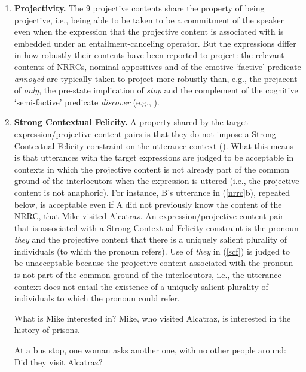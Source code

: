 \documentclass[11pt,fleqn]{article}
\newcommand{\6}{\mbox{$[\hspace*{-.6mm}[$}}
\newcommand{\9}{\mbox{$]\hspace*{-.6mm}]$}}
\def\infelic{{\leavevmode\llap{\#}}}
\begin{document}
\begin{enumerate}
	\item \textbf{Projectivity.} The 9 projective contents share the property of being projective, i.e., being able to be taken to be a commitment of the speaker even when the expression that the projective content is associated with is embedded under an entailment-canceling operator. But the expressions differ in how robustly their contents have been reported to project: 
the relevant contents of NRRCs, nominal appositives and of the emotive `factive' predicate {\em annoyed} are typically taken to project more robustly than, e.g., the prejacent of {\em only}, the pre-state implication of {\em stop} and the complement of the cognitive `semi-factive' predicate {\em discover} (e.g., \citealt{karttunen71b,simons01,potts05,abusch10,beaver-belly}). 
	\item \textbf{Strong Contextual Felicity.} A property shared by the target expression/projective content pairs is that they do not impose a Strong Contextual Felicity constraint on the utterance context (\citealt{brst-lang11}). What this means is that utterances with the target expressions are judged to be acceptable in contexts in which the projective content is not already part of the common ground of the interlocutors when the expression is uttered (i.e., the projective content is not anaphoric). For instance, B's utterance in (\ref{nrrc}b), repeated below, is acceptable even if A did not previously know the content of the NRRC, that Mike visited Alcatraz. An expression/projective content pair that is associated with a Strong Contextual Felicity constraint is the pronoun {\em they} and the projective content that there is a uniquely salient plurality of individuals (to which the pronoun refers). Use of {\em they} in (\ref{scf}) is judged to be unacceptable because the projective content associated with the pronoun is not part of the common ground of the interlocutors, i.e., the utterance context does not entail the existence of a uniquely salient plurality of individuals to which the pronoun could refer. 

\begin{exe}
\begin{xlist}
 What is Mike interested in?
 Mike, who visited Alcatraz, is interested in the history of prisons.
\end{xlist}

\ex\label{scf} At a bus stop, one woman asks another one, with no other people around: \\ \infelic Did they visit Alcatraz?
\end{exe}


\end{enumerate}
\end{document}
